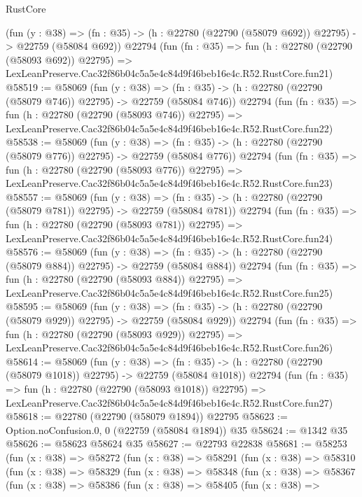 \begin{lexlean}{RustCore}
\begin{coremodule}
    (fun (y : @38) =>
    (fn : @35) -> (h : @22780 (@22790 (@58079 @692)) @22795) -> @22759 (@58084 @692))
    @22794
    (fun (fn : @35) =>
    fun (h : @22780 (@22790 (@58093 @692)) @22795) =>
    LexLeanPreserve.Cac32f86b04c5a5e4c84d9f46beb16e4c.R52.RustCore.fun21)
@58519 := @58069
    (fun (y : @38) =>
    (fn : @35) -> (h : @22780 (@22790 (@58079 @746)) @22795) -> @22759 (@58084 @746))
    @22794
    (fun (fn : @35) =>
    fun (h : @22780 (@22790 (@58093 @746)) @22795) =>
    LexLeanPreserve.Cac32f86b04c5a5e4c84d9f46beb16e4c.R52.RustCore.fun22)
@58538 := @58069
    (fun (y : @38) =>
    (fn : @35) -> (h : @22780 (@22790 (@58079 @776)) @22795) -> @22759 (@58084 @776))
    @22794
    (fun (fn : @35) =>
    fun (h : @22780 (@22790 (@58093 @776)) @22795) =>
    LexLeanPreserve.Cac32f86b04c5a5e4c84d9f46beb16e4c.R52.RustCore.fun23)
@58557 := @58069
    (fun (y : @38) =>
    (fn : @35) -> (h : @22780 (@22790 (@58079 @781)) @22795) -> @22759 (@58084 @781))
    @22794
    (fun (fn : @35) =>
    fun (h : @22780 (@22790 (@58093 @781)) @22795) =>
    LexLeanPreserve.Cac32f86b04c5a5e4c84d9f46beb16e4c.R52.RustCore.fun24)
@58576 := @58069
    (fun (y : @38) =>
    (fn : @35) -> (h : @22780 (@22790 (@58079 @884)) @22795) -> @22759 (@58084 @884))
    @22794
    (fun (fn : @35) =>
    fun (h : @22780 (@22790 (@58093 @884)) @22795) =>
    LexLeanPreserve.Cac32f86b04c5a5e4c84d9f46beb16e4c.R52.RustCore.fun25)
@58595 := @58069
    (fun (y : @38) =>
    (fn : @35) -> (h : @22780 (@22790 (@58079 @929)) @22795) -> @22759 (@58084 @929))
    @22794
    (fun (fn : @35) =>
    fun (h : @22780 (@22790 (@58093 @929)) @22795) =>
    LexLeanPreserve.Cac32f86b04c5a5e4c84d9f46beb16e4c.R52.RustCore.fun26)
@58614 := @58069
    (fun (y : @38) =>
    (fn : @35) -> (h : @22780 (@22790 (@58079 @1018)) @22795) -> @22759 (@58084 @1018))
    @22794
    (fun (fn : @35) =>
    fun (h : @22780 (@22790 (@58093 @1018)) @22795) =>
    LexLeanPreserve.Cac32f86b04c5a5e4c84d9f46beb16e4c.R52.RustCore.fun27)
@58618 := @22780 (@22790 (@58079 @1894)) @22795
@58623 := Option.noConfusion.{0, 0} (@22759 (@58084 @1894)) @35
@58624 := @1342 @35
@58626 := @58623 @58624 @35
@58627 := @22793 @22838
@58681 := @58253
    (fun (x : @38) =>
    @58272
      (fun (x : @38) =>
      @58291
        (fun (x : @38) =>
        @58310
          (fun (x : @38) =>
          @58329
            (fun (x : @38) =>
            @58348
              (fun (x : @38) =>
              @58367
                (fun (x : @38) =>
                @58386
                  (fun (x : @38) =>
                  @58405
                    (fun (x : @38) =>

\end{coremodule}
\end{lexlean}
